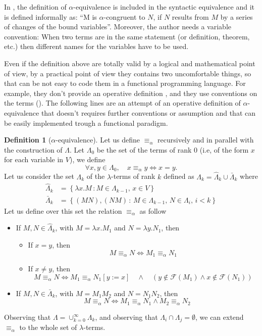 \documentclass[a4paper,11pt]{article}
\theoremstyle{definition}
\newtheorem{defn}{Definition}
\newcommand{\FF}{\mathcal{F}}
\begin{document}
In \cite{Barendregt}, the definition of $\alpha$-equivalence is included in the
syntactic equivalence and it is defined informally as: ``M is
$\alpha$-congruent to $N$, if $N$ results from $M$ by a series of changes of
the bound variables''. Moreover, the author needs a variable convention: 
When two terms are in the same statement (or definition,
theorem, etc.) then different names for the variables have to be used.

Even if the definition above are totally valid by a logical and mathematical
point of view, by a practical point of view they contains two uncomfortable
things, so that can be not easy to code them in a functional programming
language. For example, they don't provide an operative definition
\cite{Curry}, and they use conventions on the terms (\cite{Church, Barendregt}). 
The following lines are an attempt of an operative definition of
$\alpha$-equivalence that doesn't requires further conventions or assumption
and that can be easily implemented trough a functional paradigm.

\begin{defn}[$\alpha$-equivalence]
  \label{def:alpha_eq}
  Let us define $\equiv_\alpha$ recursively and in parallel with the
  construction of $\Lambda$.
  Let $\Lambda_0$ be the set of the terms of rank $0$ (i.e, of the form $x$ for
  each variable in $V$), we define
  \[
    \forall x,y \in \Lambda_0,\quad x\equiv_\alpha y\iff x=y.
  \]
  Let us consider the set $\Lambda_k$ of the $\lambda$-terms of rank $k$
  defined as $\Lambda_k = \hat\Lambda_k\cup \bar\Lambda_k$ where
  \[
    \begin{aligned}
      \hat \Lambda_k &=\left\{ \lambda
      x.M\,:M\in\Lambda_{k-1},\,x\in V\right\}\\
      \bar \Lambda_k&=\left\{ (MN), (NM)\,:\, M\in\Lambda_{k-1},\,N\in\Lambda_i,\,i<k \right\}
    \end{aligned}
  \]
  Let us define over this set the relation $\equiv_\alpha$ as follow
  \begin{itemize}
    \item If $M,N\in\hat\Lambda_{k}$, with $M=\lambda x.M_1$ and $N=\lambda
      y.N_1$, then
      \begin{itemize}
        \item If $x=y$, then
          \[
            M\equiv_\alpha N \iff M_1\equiv_\alpha N_1
          \]
        \item If $x\ne y$, then
          \[
            M\equiv_\alpha N \iff M_1\equiv_\alpha N_1[y:=x]\quad\wedge\quad
            (y\not\in\FF(M_1) \wedge x\not\in\FF(N_1))
          \]
      \end{itemize}
    \item If $M,N\in\bar\Lambda_k$, with $M=M_1M_2$ and $N=N_1N_2$, then
      \[
        M\equiv_\alpha N \iff M_1\equiv_\alpha N_1\wedge M_2\equiv_\alpha N_2
      \]
  \end{itemize}

  Observing that $\Lambda = \cup_{k=0}^\infty\Lambda_k$, and observing that
  $\Lambda_i\cap\Lambda_j=\emptyset$, we can extend $\equiv_\alpha$ to the
  whole set of $\lambda$-terms.
\end{defn}
\end{document}
